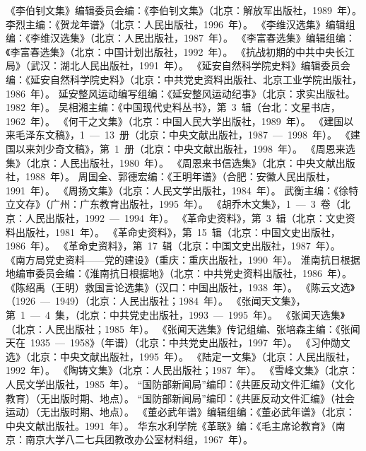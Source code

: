 \begin{thebibliography}{999}
\bibitem{}《李伯钊文集》编辑委员会编：《李伯钊文集》（北京：解放军出版社，1989~年）。
\bibitem{}李烈主编：《贺龙年谱》（北京：人民出版社，1996~年）。
\bibitem{}《李维汉选集》编辑组编：《李维汉选集》（北京：人民出版社，1987~年）。
\bibitem{}《李富春选集》编辑组编：《李富春选集》（北京：中国计划出版社，1992~年）。
\bibitem{}《抗战初期的中共中央长江局》（武汉：湖北人民出版社，1991~年）。
\bibitem{}《延安自然科学院史料》编辑委员会编：《延安自然科学院史料》（北京：中共党史资料出版社、北京工业学院出版社，1986~年）。
\bibitem{}延安整风运动编写组编：《延安整风运动纪事》（北京：求实出版社。1982~年）。
\bibitem{}吴相湘主编：《中国现代史料丛书》，第~3~辑（台北：文星书店，1962~年）。
\bibitem{}《何干之文集》（北京：中国人民大学出版社，1989~年）。
\bibitem{}《建国以来毛泽东文稿》，1~—~13~册（北京：中央文献出版社，1987~—~1998~年）。
\bibitem{}《建国以来刘少奇文稿》，第~1~册（北京：中央文献出版社，1998~年）。
\bibitem{}《周恩来选集》（北京：人民出版社，1980~年）。
\bibitem{}《周恩来书信选集》（北京：中央文献出版社，1988~年）。
\bibitem{}周国全、郭德宏编：《王明年谱》（合肥：安徽人民出版杜，1991~年）。
\bibitem{}《周扬文集》（北京：人民文学出版社，1984~年）。
\bibitem{}武衡主编：《徐特立文存》（广州：广东教育出版社，1995~年）。
\bibitem{}《胡乔木文集》，1~—~3~卷（北京：人民出版社，1992~—~1994~年）。
\bibitem{}《革命史资料》，第~3~辑（北京：文史资料出版社，1981~年）。
\bibitem{}《革命史资料》，第~15~辑（北京：中国文史出版社，1986~年）。
\bibitem{}《革命史资料》，第~17~辑（北京：中国文史出版社，1987~年）。
\bibitem{}《南方局党史资料——党的建设》（重庆：重庆出版社，1990~年）。
\bibitem{}淮南抗日根据地编审委员会编：《淮南抗日根据地》（北京：中共党史资料出版社，1986~年）。
\bibitem{}《陈绍禹（王明）救国言论选集》（汉口：中国出版社，1938~年）。
\bibitem{}《陈云文选》（1926~—~1949）（北京：人民出版社；1984~年）。
\bibitem{}《张闻天文集》，第~1~—~4~集，（北京：中共党史出版社，1993~—~1995~年）。
\bibitem{}《张闻天选集》（北京：人民出版社；1985~年）。
\bibitem{}《张闻天选集》传记组编、张培森主编：《张闻天在~1935~—~1958》（年谱）（北京：中共党史出版社，1997~年）。
\bibitem{}《习仲勋文选》（北京：中央文献出版社，1995~年）。
\bibitem{}《陆定一文集》（北京：人民出版社，1992~年）。
\bibitem{}《陶铸文集》（北京：人民出版社；1987~年）。
\bibitem{}《雪峰文集》（北京：人民文学出版社，1985~年）。
\bibitem{}“国防部新闻局”编印：《共匪反动文件汇编》（文化教育）（无出版时期、地点）。
\bibitem{}“国防部新闻局”编印：《共匪反动文件汇编》（社会运动）（无出版时期、地点）。
\bibitem{}《董必武年谱》编辑组编：《董必武年谱》（北京：中央文献出版社。1991~年）。
\bibitem{}华东水利学院《革联》编：《毛主席论教育》（南京：南京大学八二七兵团教改办公室材料组，1967~年）。

\end{thebibliography}
